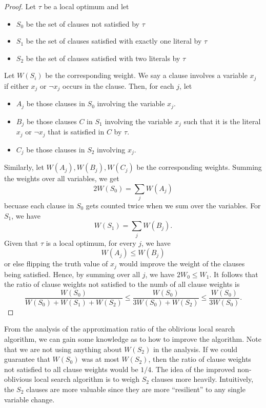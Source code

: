 \begin{proof}
    Let $\tau$ be a local optimum and let
    \begin{itemize}
        \item $S_0$ be the set of clauses not satisfied by $\tau$
        \item $S_1$ be the set of clauses satisfied with exactly one literal by $\tau$
        \item $S_2$ be the set of clauses satisfied with two literals by $\tau$ 
    \end{itemize}
    Let $W(S_i)$ be the corresponding weight. We say a clause involves a variable $x_j$ if either $x_j$ or $\neg x_j$ occurs in the clause. Then, for each $j$, let

    \begin{itemize}
        \item $A_j$ be those clauses in $S_0$ involving the variable $x_j$.
        \item $B_j$ be those clauses $C$ in $S_1$ involving the variable $x_j$ such that it is the literal $x_j$ or $\neg x_j$ that is satisfied in $C$ by $\tau$.
        \item $C_j$ be those clauses in $S_2$ involving $x_j$.
    \end{itemize}
    Similarly, let $W(A_j),W(B_j),W(C_j)$ be the corresponding weights. Summing the weights over all variables, we get
    $$
    2W(S_0) = \sum_{j} W(A_j)
    $$
    becuase each clause in $S_0$ gets counted twice when we sum over the variables. For $S_1$, we have
    $$
    W(S_1) = \sum_{j} W(B_j).
    $$
    Given that $\tau$ is a local optimum, for every $j$, we have
    $$
    W(A_j) \leq W(B_j)
    $$
    or else flipping the truth value of $x_j$ would improve the weight of the clauses being satisfied. Hence, by summing over all $j$, we have $2W_0 \leq W_1$. It follows that the ratio of clause weights not satisfied to the numb of all clause weights is
    $$
    \frac{W(S_0)}{W(S_0)+W(S_1)+W(S_2)} \leq \frac{W(S_0)}{3W(S_0)+W(S_2)} \leq \frac{W(S_0)}{3W(S_0)}.
    $$
\end{proof}

From the analysis of the approximation ratio of the oblivious local search algorithm, we can gain some knowledge as to how to improve the algorithm. Note that we are not using anything about $W(S_2)$ in the analysis. If we could guarantee that $W(S_0)$ was at most $W(S_2)$, then the ratio of clause weights not satisfied to all clause weights would be $1/4$. The idea of the improved non-oblivious local search algorithm is to weigh $S_2$ clauses more heavily. Intuitively, the $S_2$ clauses are more valuable since they are more ``resilient'' to any single variable change.

